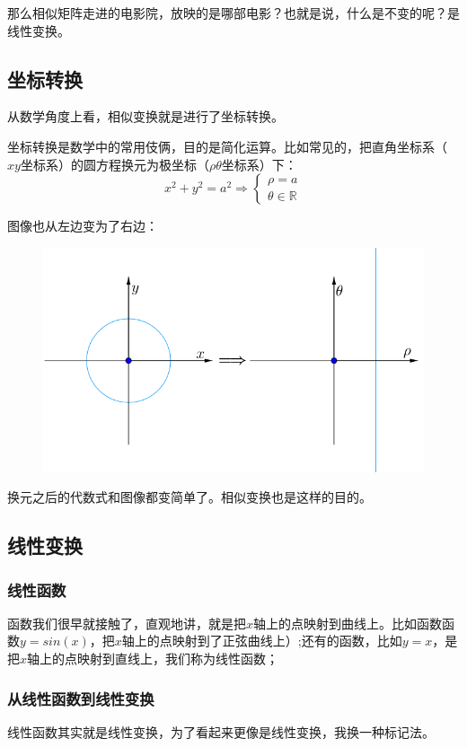 \documentclass[12pt]{article}
\begin{document}
那么相似矩阵走进的电影院，放映的是哪部电影？也就是说，什么是不变的呢？是线性变换。

\subsection{坐标转换}
从数学角度上看，相似变换就是进行了坐标转换。

坐标转换是数学中的常用伎俩，目的是简化运算。比如常见的，把直角坐标系（$xy$坐标系）的圆方程换元为极坐标（$\rho\theta$坐标系）下：
$$
x^2 + y^2 = a^2 \Rightarrow \begin{cases}
\rho = a \\
\theta \in \mathbb{R}
\end{cases}
$$

图像也从左边变为了右边：
\begin{figure}[H]
    \centering
    \includegraphics[width=.8\textwidth]{fig/UnderstandSimilarMatrix_1.png}
\end{figure} 

换元之后的代数式和图像都变简单了。相似变换也是这样的目的。

\subsection{线性变换}
\subsubsection{线性函数}
函数我们很早就接触了，直观地讲，就是把$x$轴上的点映射到曲线上。比如函数函数$y=sin(x)$，把$x$轴上的点映射到了正弦曲线上）;还有的函数，比如$y=x$，是把$x$轴上的点映射到直线上，我们称为线性函数；

\subsubsection{从线性函数到线性变换}
线性函数其实就是线性变换，为了看起来更像是线性变换，我换一种标记法。
\end{document}
